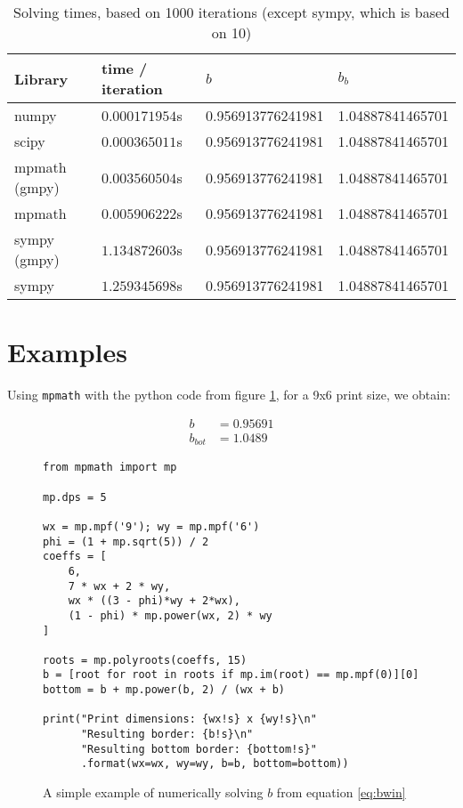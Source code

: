 \documentclass[
    paper=letter,
    parskip=half-,
    DIV=10,
]{scrartcl}
\begin{document}
\begin{table}
\caption{Solving times, based on 1000 iterations (except sympy, which is based on 10)}\label{tbl:times}
\centering
\begin{tabular}{llll}
\hline
Library              & time / iteration  & $b$ & $b_b$ \\
\hline
numpy                & $0.000171954$s    & 0.956913776241981   & 1.04887841465701 \\
scipy                & $0.000365011$s    & 0.956913776241981   & 1.04887841465701 \\
mpmath (gmpy)        & $0.003560504$s    & 0.956913776241981   & 1.04887841465701 \\
mpmath               & $0.005906222$s    & 0.956913776241981   & 1.04887841465701 \\
sympy (gmpy)         & $1.134872603$s    & 0.956913776241981   & 1.04887841465701 \\
sympy                & $1.259345698$s    & 0.956913776241981   & 1.04887841465701 \\
\hline
\end{tabular}
\end{table}


\section{Examples}

Using \texttt{mpmath} with the python code from figure \ref{code:solver1}, for a 9x6 print size, we obtain:

    \begin{align*}
        b &= 0.95691 \\
        b_{bot} &= 1.0489
    \end{align*}

\begin{figure}
\label{code:solver1}
\caption{A simple example of numerically solving $b$ from equation \ref{eq:bwin}}
\begin{verbatim}
from mpmath import mp

mp.dps = 5

wx = mp.mpf('9'); wy = mp.mpf('6')
phi = (1 + mp.sqrt(5)) / 2
coeffs = [
    6,
    7 * wx + 2 * wy,
    wx * ((3 - phi)*wy + 2*wx),
    (1 - phi) * mp.power(wx, 2) * wy
]

roots = mp.polyroots(coeffs, 15)
b = [root for root in roots if mp.im(root) == mp.mpf(0)][0]
bottom = b + mp.power(b, 2) / (wx + b)

print("Print dimensions: {wx!s} x {wy!s}\n"
      "Resulting border: {b!s}\n"
      "Resulting bottom border: {bottom!s}"
      .format(wx=wx, wy=wy, b=b, bottom=bottom))
\end{verbatim}
\end{figure}
\end{document}
